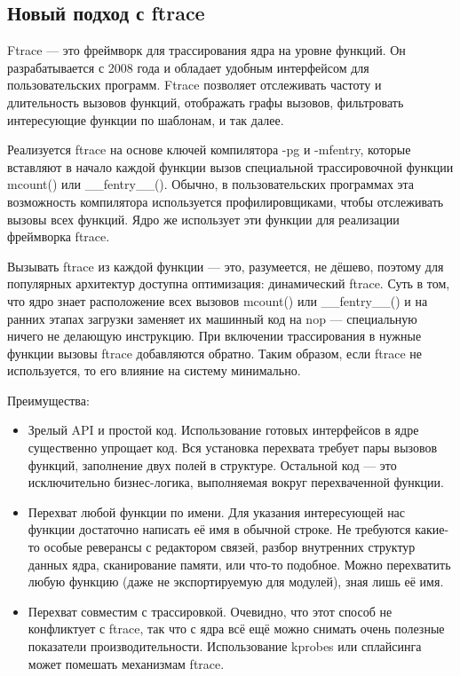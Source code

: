 \subsection{Новый подход с ftrace}
Ftrace — это фреймворк для трассирования ядра на уровне функций. Он разрабатывается с 2008 года и обладает удобным интерфейсом для пользовательских программ. Ftrace позволяет отслеживать частоту и длительность вызовов функций, отображать графы вызовов, фильтровать интересующие функции по шаблонам, и так далее.

Реализуется ftrace на основе ключей компилятора -pg и -mfentry, которые вставляют в начало каждой функции вызов специальной трассировочной функции mcount() или \_\_fentry\_\_(). Обычно, в пользовательских программах эта возможность компилятора используется профилировщиками, чтобы отслеживать вызовы всех функций. Ядро же использует эти функции для реализации фреймворка ftrace.

Вызывать ftrace из каждой функции — это, разумеется, не дёшево, поэтому для популярных архитектур доступна оптимизация: динамический ftrace. Суть в том, что ядро знает расположение всех вызовов mcount() или \_\_fentry\_\_() и на ранних этапах загрузки заменяет их машинный код на nop — специальную ничего не делающую инструкцию. При включении трассирования в нужные функции вызовы ftrace добавляются обратно. Таким образом, если ftrace не используется, то его влияние на систему минимально.

Преимущества:
\begin{itemize}
	\item Зрелый API и простой код. Использование готовых интерфейсов в ядре существенно упрощает код. Вся установка перехвата требует пары вызовов функций, заполнение двух полей в структуре. Остальной код — это исключительно бизнес-логика, выполняемая вокруг перехваченной функции.
	\item Перехват любой функции по имени. Для указания интересующей нас функции достаточно написать её имя в обычной строке. Не требуются какие-то особые реверансы с редактором связей, разбор внутренних структур данных ядра, сканирование памяти, или что-то подобное. Можно перехватить любую функцию (даже не экспортируемую для модулей), зная лишь её имя.
	\item Перехват совместим с трассировкой. Очевидно, что этот способ не конфликтует с ftrace, так что с ядра всё ещё можно снимать очень полезные показатели производительности. Использование kprobes или сплайсинга может помешать механизмам ftrace.
\end{itemize}

